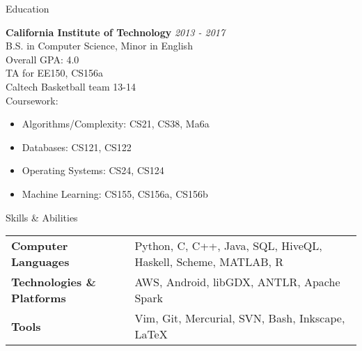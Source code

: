 \documentclass{resume} %
\begin{document}

\begin{rSection}{Education}

{\bf California Institute of Technology} \hfill {\em 2013 - 2017} \\
B.S. in Computer Science, Minor in English \\ 
Overall GPA: 4.0 \smallskip \\
TA for EE150, CS156a \\
Caltech Basketball team 13-14 \smallskip \\
Coursework:
\vspace{-5.0mm}
\begin{minipage}{0.43\linewidth}
\begin{itemize}
    \item{Algorithms/Complexity: CS21, CS38, Ma6a}
    \item{Databases: CS121, CS122}
\end{itemize}
\end{minipage}
\begin{minipage}{0.43\linewidth}
\begin{itemize}
    \item{Operating Systems: CS24, CS124}
    \item{Machine Learning: CS155, CS156a, CS156b}
\end{itemize}
\end{minipage}
\vspace{5mm}
\end{rSection}


\begin{rSection}{Skills \& Abilities}

\begin{tabularx}{\textwidth}{@{}lX}
    \bfseries{Computer Languages}   &  Python, C, C++, Java, SQL, HiveQL, Haskell, Scheme, MATLAB, R \\
    \bfseries{Technologies \& Platforms}   &   AWS, Android, libGDX, ANTLR, Apache Spark \\
    \bfseries{Tools}   &  Vim, Git, Mercurial, SVN, Bash, Inkscape, \LaTeX \\
\end{tabularx}

\end{rSection}
\end{document}
